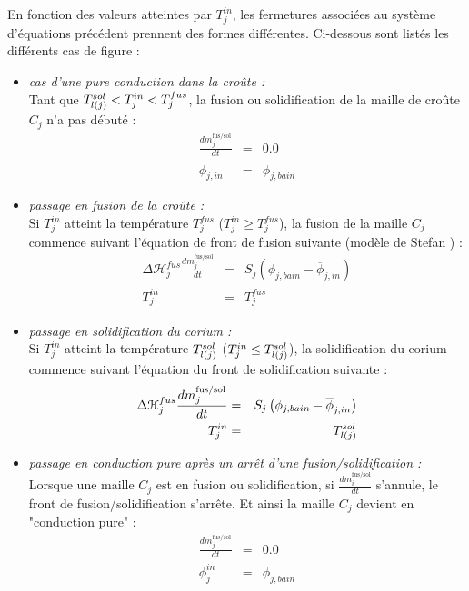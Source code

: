 En fonction des valeurs atteintes par $T_j^{in}$, les fermetures associées au système d'équations précédent prennent des formes différentes. Ci-dessous sont listés les différents cas de figure :\\

\begin{itemize}
\item {\it cas d'une pure conduction dans la croûte :}\\
Tant que $\temperature[sol]{l(j)}<T_j^{in}<T_j^{fus}$, la fusion ou solidification de la maille de croûte $C_j$ n'a pas débuté :
\begin{eqnarray*}
\frac{dm_j^\text{fus/sol}}{dt} &=& 0.0 \\
\overline{\phi}_{j,in} &=& \phi_{j,bain}
\end{eqnarray*}

\item {\it passage en fusion de la croûte :}\\
Si $T_j^{in}$ atteint la température $T_j^{fus}$ ($T_j^{in}\ge T_j^{fus}$), la fusion de la maille $C_j$ commence suivant l'équation de front de fusion suivante (modèle de Stefan \cite{LeTellier2016}) :
\begin{eqnarray*}
\Delta \mathcal{H}_j^{fus} \frac{dm_j^\text{fus/sol}}{dt} &=& S_j\left(\phi_{j,bain} - \overline{\phi}_{j,in}\right) \\
T_j^{in} &=& T_j^{fus}
\end{eqnarray*}

\item {\it passage en solidification du corium :}\\
Si $T_j^{in}$ atteint la température $\temperature[sol]{l(j)}$ ($T_j^{in}\le \temperature[sol]{l(j)}$), la solidification du corium commence suivant l'équation du front de solidification suivante :
\begin{eqnarray*}
\Delta \mathcal{H}_j^{fus} \frac{dm_j^\text{fus/sol}}{dt} &=& S_j\left(\phi_{j,bain} - \overline{\phi}_{j,in}\right) \\
T_j^{in} &=& \temperature[sol]{l(j)}
\end{eqnarray*}

\item {\it passage en conduction pure après un arrêt d'une fusion/solidification :}\\
Lorsque une maille $C_j$ est en fusion ou solidification, si $\frac{dm_i^\text{fus/sol}}{dt}$ s'annule, le front de fusion/solidification s'arrête. Et ainsi la maille $C_j$ devient en "conduction pure" :
\begin{eqnarray*}
\frac{dm_j^\text{fus/sol}}{dt} &=& 0.0 \\
\phi_j^{in} &=& \phi_{j,bain}
\end{eqnarray*}
\end{itemize}

